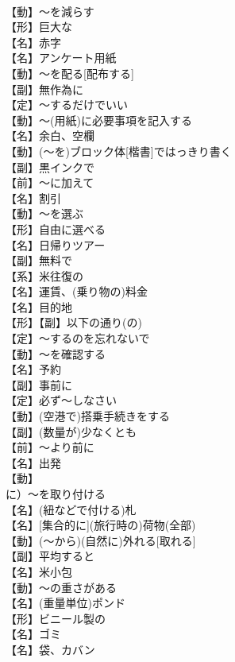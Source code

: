 \documentclass[8pt]{extreport}
\begin{document}
\begin{CJK}{UTF8}{min}
\\	【動】～を減らす
\\	【形】巨大な
\\	【名】赤字
\\	【名】アンケート用紙
\\	【動】～を配る[配布する]
\\	【副】無作為に
\\	【定】～するだけでいい
\\	【動】～(用紙)に必要事項を記入する
\\	【名】余白、空欄
\\	【動】(～を)ブロック体[楷書]ではっきり書く
\\	【副】黒インクで
\\	【前】～に加えて
\\	【名】割引
\\	【動】～を選ぶ
\\	【形】自由に選べる
\\	【名】日帰りツアー
\\	【副】無料で
\\	【系】{米}往復の
\\	【名】運賃、(乗り物の)料金
\\	【名】目的地
\\	【形】【副】以下の通り(の)
\\	【定】～するのを忘れないで
\\	【動】～を確認する
\\	【名】予約
\\	【副】事前に
\\	【定】必ず～しなさい
\\	【動】(空港で)搭乗手続きをする
\\	【副】(数量が)少なくとも
\\	【前】～より前に
\\	【名】出発
\\	【動】
\\	に）～を取り付ける
\\	【名】(紐などで付ける)札
\\	【名】[集合的に](旅行時の)荷物(全部)
\\	【動】(～から)(自然に)外れる[取れる]
\\	【副】平均すると
\\	【名】{米}小包
\\	【動】～の重さがある
\\	【名】(重量単位)ポンド
\\	【形】ビニール製の
\\	【名】ゴミ
\\	【名】袋、カバン

\end{CJK}
\end{document}
